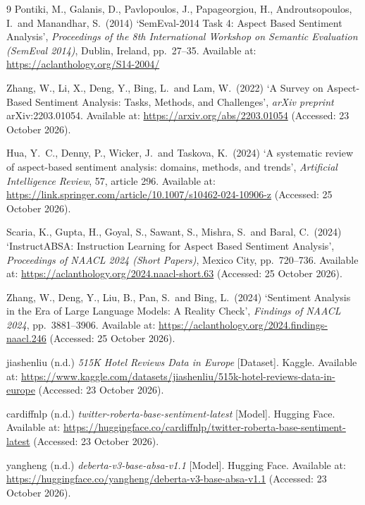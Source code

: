 \documentclass[11pt,a4paper]{article}
\begin{document}
\FloatBarrier
\begin{thebibliography}{9}
Pontiki, M., Galanis, D., Pavlopoulos, J., Papageorgiou, H., Androutsopoulos, I.\ and Manandhar, S.\ (2014)
`SemEval-2014 Task 4: Aspect Based Sentiment Analysis',
\emph{Proceedings of the 8th International Workshop on Semantic Evaluation (SemEval 2014)}, Dublin, Ireland, pp.\ 27--35.
Available at: \url{https://aclanthology.org/S14-2004/}

Zhang, W., Li, X., Deng, Y., Bing, L.\ and Lam, W.\ (2022) `A Survey on Aspect-Based Sentiment Analysis: Tasks, Methods, and Challenges', \emph{arXiv preprint} arXiv:2203.01054.
Available at: \url{https://arxiv.org/abs/2203.01054} (Accessed: 23 October 2026).

Hua, Y.\ C., Denny, P., Wicker, J.\ and Taskova, K.\ (2024) `A systematic review of aspect-based sentiment analysis: domains, methods, and trends', \emph{Artificial Intelligence Review}, 57, article 296.
Available at: \url{https://link.springer.com/article/10.1007/s10462-024-10906-z} (Accessed: 25 October 2026).

Scaria, K., Gupta, H., Goyal, S., Sawant, S., Mishra, S.\ and Baral, C.\ (2024) `InstructABSA: Instruction Learning for Aspect Based Sentiment Analysis', \emph{Proceedings of NAACL 2024 (Short Papers)}, Mexico City, pp.\ 720--736.
Available at: \url{https://aclanthology.org/2024.naacl-short.63} (Accessed: 25 October 2026).

Zhang, W., Deng, Y., Liu, B., Pan, S.\ and Bing, L.\ (2024) `Sentiment Analysis in the Era of Large Language Models: A Reality Check', \emph{Findings of NAACL 2024}, pp.\ 3881--3906.
Available at: \url{https://aclanthology.org/2024.findings-naacl.246} (Accessed: 25 October 2026).

jiashenliu (n.d.) \emph{515K Hotel Reviews Data in Europe} [Dataset]. Kaggle.
Available at: \url{https://www.kaggle.com/datasets/jiashenliu/515k-hotel-reviews-data-in-europe} (Accessed: 23 October 2026).

cardiffnlp (n.d.) \emph{twitter-roberta-base-sentiment-latest} [Model]. Hugging Face.
Available at: \url{https://huggingface.co/cardiffnlp/twitter-roberta-base-sentiment-latest} (Accessed: 23 October 2026).

yangheng (n.d.) \emph{deberta-v3-base-absa-v1.1} [Model]. Hugging Face.
Available at: \url{https://huggingface.co/yangheng/deberta-v3-base-absa-v1.1} (Accessed: 23 October 2026).
\end{thebibliography}
\end{document}
